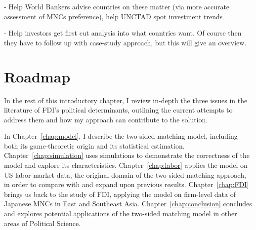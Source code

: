 - Help World Bankers advise countries on these matter (via more accurate
assessment of MNCs preference), help UNCTAD spot investment trends

- Help investors get first cut analysis into what countries want. Of course then
they have to follow up with case-study approach, but this will give an overview.

\section{Roadmap}

In the rest of this introductory chapter, I review in-depth the three issues in
the literature of FDI's political determinants, outlining the current attempts
to address them and how my approach can contribute to the solution.

In Chapter~\ref{chap:model}, I describe the two-sided matching model, including
both its game-theoretic origin and its statistical estimation.
Chapter~\ref{chap:simulation} uses simulations to demonstrate the correctness of
the model and explore its characteristics. Chapter~\ref{chap:labor} applies the
model on US labor market data, the original domain of the two-sided matching
approach, in order to compare with and expand upon previous results.
Chapter~\ref{chap:FDI} brings us back to the study of FDI, applying the model on
firm-level data of Japanese MNCs in East and Southeast Asia.
Chapter~\ref{chap:conclusion} concludes and explores potential applications of
the two-sided matching model in other areas of Political Science.

